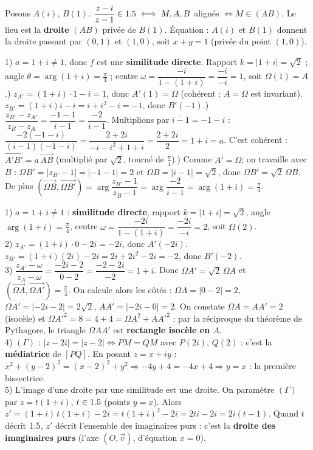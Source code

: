 Posons $A(i)$, $B(1)$. $\dfrac{z-i}{z-1}\in1.5\iff M,A,B$ alignés $\iff M\in(AB)$. Le lieu est la
\textbf{droite} $(AB)$ privée de $B(1)$. Équation : $A(i)$ et $B(1)$ donnent la droite passant par
$(0,1)$ et $(1,0)$, soit $x+y=1$ (privée du point $(1,0)$).

1) $a=1+i\neq1$, donc $f$ est une \textbf{similitude directe}. Rapport $k=|1+i|=\sqrt2$ ;
angle $\theta=\arg(1+i)=\frac\pi4$ ; centre $\omega=\dfrac{-i}{1-(1+i)}=\dfrac{-i}{-i}=1$, soit $\Omega(1)=A$.) $z_{A'}=(1+i)\cdot1-i=1$, donc $A'(1)=\Omega$ (cohérent : $A=\Omega$ est invariant).
$z_{B'}=(1+i)i-i=i+i^2-i=-1$, donc $B'(-1)$.) $\dfrac{z_{B'}-z_{A'}}{z_B-z_A}=\dfrac{-1-1}{i-1}=\dfrac{-2}{i-1}$. Multiplions par $\overline{i-1}=-1-i$ :
$\dfrac{-2(-1-i)}{(i-1)(-1-i)}=\dfrac{2+2i}{-i-i^2+1+i}=\dfrac{2+2i}{2}=1+i=a$. C'est cohérent :
$\overrightarrow{A'B'}=a\,\overrightarrow{AB}$ (multiplié par $\sqrt2$, tourné de $\frac\pi4$).) Comme $A'=\Omega$, on travaille avec $B$ : $\Omega B'=|z_{B'}-1|=|-1-1|=2$ et
$\Omega B=|i-1|=\sqrt2$, donc $\Omega B'=\sqrt2\,\Omega B$. De plus
$(\overrightarrow{\Omega B},\overrightarrow{\Omega B'})=\arg\dfrac{z_{B'}-1}{z_B-1}
=\arg\dfrac{-2}{i-1}=\arg(1+i)=\frac\pi4$.

1) $a=1+i\neq1$ : \textbf{similitude directe}, rapport $k=|1+i|=\sqrt2$, angle $\arg(1+i)=\frac\pi4$,
centre $\omega=\dfrac{-2i}{1-(1+i)}=\dfrac{-2i}{-i}=2$, soit $\Omega(2)$.\\
2) $z_{A'}=(1+i)\cdot0-2i=-2i$, donc $A'(-2i)$.\;
$z_{B'}=(1+i)(2i)-2i=2i+2i^2-2i=-2$, donc $B'(-2)$.\\
3) $\dfrac{z_{A'}-\omega}{z_A-\omega}=\dfrac{-2i-2}{0-2}=\dfrac{-2-2i}{-2}=1+i$. Donc
$\Omega A'=\sqrt2\,\Omega A$ et $(\overrightarrow{\Omega A},\overrightarrow{\Omega A'})=\frac\pi4$.
On calcule alors les côtés : $\Omega A=|0-2|=2$, $\Omega A'=|-2i-2|=2\sqrt2$, $AA'=|-2i-0|=2$.
On constate $\Omega A=AA'=2$ (isocèle) et $\Omega A'^2=8=4+4=\Omega A^2+AA'^2$ : par la réciproque
du théorème de Pythagore, le triangle $\Omega A A'$ est \textbf{rectangle isocèle en $A$}.\\
4) $(\Gamma)$ : $|z-2i|=|z-2|\iff PM=QM$ avec $P(2i)$, $Q(2)$ : c'est la \textbf{médiatrice} de
$[PQ]$. En posant $z=x+iy$ : $x^2+(y-2)^2=(x-2)^2+y^2\Rightarrow -4y+4=-4x+4\Rightarrow y=x$ : la
première bissectrice.\\
5) L'image d'une droite par une similitude est une droite. On paramètre $(\Gamma)$ par $z=t(1+i)$,
$t\in1.5$ (points $y=x$). Alors $z'=(1+i)\,t(1+i)-2i=t(1+i)^2-2i=2ti-2i=2i(t-1)$. Quand $t$ décrit
$1.5$, $z'$ décrit l'ensemble des imaginaires purs : c'est la \textbf{droite des imaginaires purs}
(l'axe $(O,\vec v)$, d'équation $x=0$).

